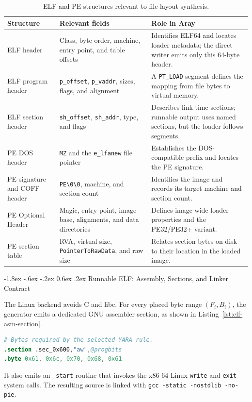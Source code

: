 \documentclass[11pt,twocolumn]{article}
\makeatletter
\newcommand{\code}[1]{\texttt{#1}}
\renewcommand\subsection{\@startsection{subsection}{2}{\z@}%
  {-1.8ex \@plus -.6ex \@minus -.2ex}%
  {0.6ex \@plus .2ex}%
  {\normalfont\normalsize\bfseries}}
\makeatother
\begin{document}
\begin{table}[t]
  \small
  \centering
  \begin{tabular}{@{}>{\raggedright\arraybackslash}p{}>{\raggedright\arraybackslash}p{}>{\raggedright\arraybackslash}p{}@{}}
    \toprule
    \textbf{Structure} & \textbf{Relevant fields} & \textbf{Role in Aray} \\
    \midrule
    ELF header & Class, byte order, machine, entry point, and table offsets & Identifies ELF64 and locates loader metadata; the direct writer emits only this 64-byte header. \\
    ELF program header & \code{p\_offset}, \code{p\_vaddr}, sizes, flags, and alignment & A \code{PT\_LOAD} segment defines the mapping from file bytes to virtual memory. \\
    ELF section header & \code{sh\_offset}, \code{sh\_addr}, type, and flags & Describes link-time sections; runnable output uses named sections, but the loader follows segments. \\
    PE DOS header & \code{MZ} and the \code{e\_lfanew} file pointer & Establishes the DOS-compatible prefix and locates the PE signature. \\
    PE signature and COFF header & \code{PE\textbackslash0\textbackslash0}, machine, and section count & Identifies the image and records its target machine and section count. \\
    PE Optional Header & Magic, entry point, image base, alignments, and data directories & Defines image-wide loader properties and the PE32/PE32+ variant. \\
    PE section table & RVA, virtual size, \code{PointerToRawData}, and raw size & Relates section bytes on disk to their location in the loaded image. \\
    \bottomrule
  \end{tabular}
  \caption{ELF and PE structures relevant to file-layout synthesis.}
  \label{tab:binary-structures}
\end{table}
\subsection{Runnable ELF: Assembly, Sections, and Linker Contract}

The Linux backend avoids C and libc. For every placed byte range $(F_i,B_i)$,
the generator emits a dedicated GNU assembler section, as shown in
Listing~\ref{lst:elf-asm-section}.
\begin{lstlisting}[language=GNUAssembler,caption={Generated ELF payload section for a witness requested at offset \code{0x600}.},label={lst:elf-asm-section}]
# Bytes required by the selected YARA rule.
.section .sec_0x600,"aw",@progbits
.byte 0x61, 0x6c, 0x70, 0x68, 0x61
\end{lstlisting}
It also emits an \code{\_start} routine that invokes the x86-64 Linux
\code{write} and \code{exit} system calls. The resulting source is linked with
\code{gcc -static -nostdlib -no-pie}.
\end{document}
